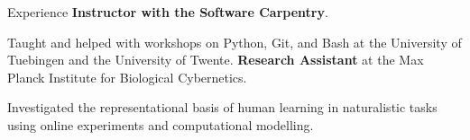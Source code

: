 \begin{rubric}{Experience}
	\entry*[2022 -- \; \ldots \; ]
	\hspace{-2mm} 
	\textbf{Instructor with the Software Carpentry}. \par
	\par Taught and helped with workshops on Python, Git, and Bash at the University of Tuebingen and the University of Twente.
	\entry*[2021 -- 2023]
	\hspace{-2mm} 
	\textbf{Research Assistant} at the Max Planck Institute for Biological Cybernetics.\par
	\par Investigated the representational basis of human learning in naturalistic tasks using online experiments and computational modelling.
\end{rubric}
